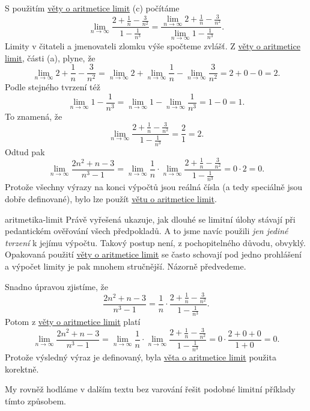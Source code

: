 \begin{probsol}
 S použitím \hyperref[thm:aritmetika-limit]{věty o aritmetice limit} (c)
 počítáme
 \[
  \lim_{n \to \infty} \frac{2 + \frac{1}{n} - \frac{3}{n^2}}{1 - \frac{1}{n^3}}
  = \frac{\lim_{n \to \infty} 2 + \frac{1}{n} - \frac{3}{n^2}}{\lim_{n \to
  \infty} 1 - \frac{1}{n^3}}.
 \]
 Limity v čitateli a jmenovateli zlomku výše spočteme zvlášť. Z
 \hyperref[thm:aritmetika-limit]{věty o aritmetice limit}, části (a), plyne, že
 \[
  \lim_{n \to \infty} 2 + \frac{1}{n} - \frac{3}{n^2} = \lim_{n \to \infty} 2 +
  \lim_{n \to \infty} \frac{1}{n} - \lim_{n \to \infty} \frac{3}{n^2} = 2 + 0 -
  0 = 2.
 \]
 Podle stejného tvrzení též
 \[
  \lim_{n \to \infty} 1 - \frac{1}{n^3} = \lim_{n \to \infty} 1 - \lim_{n \to
  \infty} \frac{1}{n^3} = 1 - 0 = 1.
 \]
 To znamená, že
 \[
  \lim_{n \to \infty} \frac{2 + \frac{1}{n} - \frac{3}{n^2}}{1 - \frac{1}{n^3}}
  = \frac{2}{1} = 2.
 \]
 Odtud pak
 \[
  \lim_{n \to \infty} \frac{2n^2 + n - 3}{n^3 - 1} = \lim_{n \to \infty}
  \frac{1}{n} \cdot \lim_{n \to \infty} \frac{2 + \frac{1}{n} - \frac{3}{n^2}}{1
  - \frac{1}{n^3}} = 0 \cdot 2 = 0.
 \]
 Protože všechny výrazy na konci výpočtů jsou reálná čísla (a tedy speciálně jsou
 dobře definované), bylo lze použít \hyperref[thm:aritmetika-limit]{větu o
 aritmetice limit}.
\end{probsol}

\begin{remark}{}{aritmetika-limit}
 Právě vyřešená  ukazuje, jak dlouhé se
 limitní úlohy stávají při pedantickém ověřování všech předpokladů. A to jsme
 navíc použili \emph{jen jediné tvrzení} k jejímu výpočtu. Takový postup není, z
 pochopitelného důvodu, obvyklý. Opakovaná použití
 \hyperref[thm:aritmetika-limit]{věty o aritmetice limit} se často schovají pod
 jedno prohlášení a výpočet limity je pak mnohem stručnější. Názorně předvedeme.

 Snadno úpravou zjistíme, že
 \[
  \frac{2n^2 + n - 3}{n^3 - 1} = \frac{1}{n} \cdot \frac{2 + \frac{1}{n} -
  \frac{3}{n^2}}{1 - \frac{1}{n^3}}.
 \]
 Potom z \hyperref[thm:aritmetika-limit]{věty o aritmetice limit} platí
 \[
  \lim_{n \to \infty} \frac{2n^2 + n - 3}{n^3 - 1} = \lim_{n \to \infty}
  \frac{1}{n} \cdot \lim_{n \to \infty} \frac{2 + \frac{1}{n} - \frac{3}{n^2}}{1
  - \frac{1}{n^3}} = 0 \cdot \frac{2 + 0 + 0}{1 + 0} = 0.
 \]
 Protože výsledný výraz je definovaný, byla \hyperref[thm:aritmetika-limit]{věta
 o aritmetice limit} použita korektně.

 My rovněž hodláme v dalším textu bez varování řešit podobné limitní příklady
 tímto  způsobem.
\end{remark}

